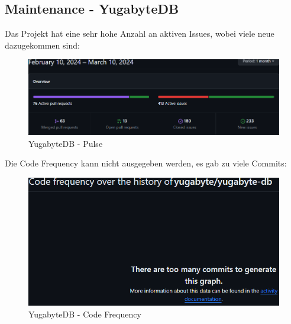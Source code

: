 
\clearpage
{}
\recalctypearea
\begin{flushleft}
    \subsection{Maintenance - YugabyteDB}
    \label{subsec:maintenance_yugabytedb}
    Das Projekt hat eine sehr hohe Anzahl an aktiven Issues, wobei viele neue dazugekommen sind:
    \begin{figure}[H]
        \centering
        \includegraphics[width=0.75\linewidth]{source/implementation/evaluation/postgresql_ha_solutions/insights/yugabytedb/pulse_yugabyte_yugabyte-db}
        \caption{YugabyteDB - Pulse}
        \label{fig:pulse_yugabyte_yugabyte-db}
    \end{figure}

    Die Code Frequency kann nicht ausgegeben werden, es gab zu viele Commits:
    \begin{figure}[H]
        \centering
        \includegraphics[width=0.75\linewidth]{source/implementation/evaluation/postgresql_ha_solutions/insights/yugabytedb/code_frequency_yugabyte_yugabyte-db}
        \caption{YugabyteDB - Code Frequency}
        \label{fig:code_frequency_yugabyte_yugabyte-db}
    \end{figure}
\end{flushleft}
\clearpage
